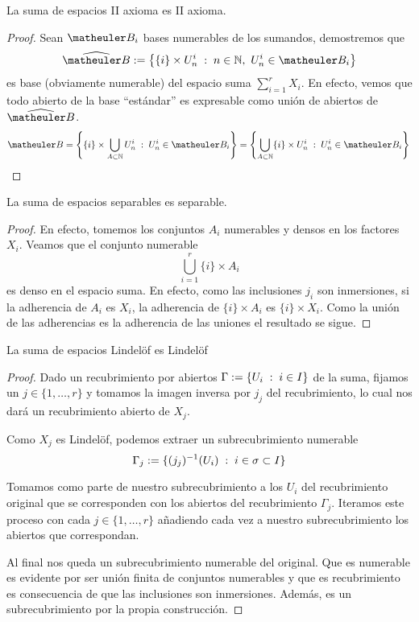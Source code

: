 \begin{lem}
	La suma de espacios II axioma es II axioma.
\end{lem}
\begin{proof}
	Sean $\B_i$ bases numerables de los sumandos, demostremos que
	\[\widehat{\B}:=\left\{\{i\}\times U_n^i\midc n\in\N,\ U_n^i\in\B_i\right\}\]
	es base (obviamente numerable) del espacio suma $\sum_{i=1}^rX_i$. En efecto, vemos que todo abierto de la base ``estándar'' es expresable como unión de abiertos de $\widehat{\B}$. 
	\begin{equation*}
		\B=\left\{\{i\}\times\bigcup_{A\subset \N}U_n^i\midc U_n^i\in\B_i\right\}=\left\{\bigcup_{A\subset\N}\{i\}\times U_n^i\midc U_n^i\in\B_i\right\}\qedhere
	\end{equation*}
\end{proof}

\begin{lem}
	La suma de espacios separables es separable.
\end{lem}
\begin{proof}
	En efecto, tomemos los conjuntos $A_i$ numerables y densos en los factores $X_i$. Veamos que el conjunto numerable
	\begin{equation*}
		\bigcup_{i=1}^r\{i\}\times A_i
	\end{equation*}
	es denso en el espacio suma. En efecto, como las inclusiones $j_i$ son inmersiones, si la adherencia de $A_i$ es $X_i$, la adherencia de $\{i\}\times A_i$ es $\{i\}\times X_i$. Como la unión de las adherencias es la adherencia de las uniones el resultado se sigue. 
\end{proof}

\begin{lem}
	\label{num_lem_lindelofSumas}
	La suma de espacios Lindelöf es Lindelöf
\end{lem}
\begin{proof}
	Dado un recubrimiento por abiertos $\Gamma:=\{U_i\;:\; i\in I\}$ de la suma, fijamos un $j\in\{1,\dots,r\}$ y tomamos la imagen inversa por $j_j$ del recubrimiento, lo cual nos dará un recubrimiento abierto de $X_j$.
	
	Como $X_j$ es Lindelöf, podemos extraer un subrecubrimiento numerable \[\Gamma_j:=\{(j_j)^{-1}(U_i)\;:\; i\in\sigma\subset I\}\]
	
	Tomamos como parte de nuestro subrecubrimiento a los $U_i$ del recubrimiento original que se corresponden con los abiertos del recubrimiento $\Gamma_j$. Iteramos este proceso con cada $j\in\{1,\dots,r\}$ añadiendo cada vez a nuestro subrecubrimiento los abiertos que correspondan.
	
	Al final nos queda un subrecubrimiento numerable del original. Que es numerable es evidente por ser unión finita de conjuntos numerables y que es recubrimiento es consecuencia de que las inclusiones son inmersiones. Además, es un subrecubrimiento por la propia construcción.
\end{proof}
